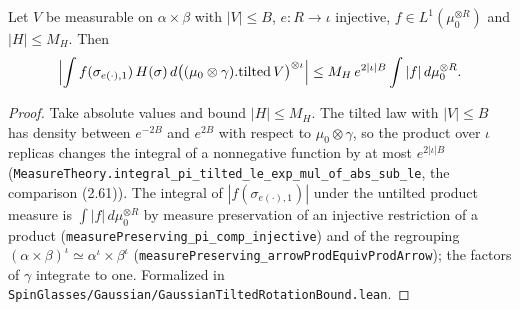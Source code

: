 \begin{lemma}\label{lem:sg-tal:perceptron-tilted-l1-bound}
  \leanok
Let $V$ be measurable on $\alpha\times\beta$ with $|V|\le B$, $e:R\to\iota$ injective, $f\in L^1(\mu_0^{\otimes R})$ and $|H|\le M_H$. Then
\[
 \Bigl|\int f(\sigma_{e(\cdot),1})\,H(\sigma)\,d\bigl((\mu_0\otimes\gamma).\mathrm{tilted}\,V\bigr)^{\otimes\iota}\Bigr|\le M_H\,e^{2|\iota|B}\int|f|\,d\mu_0^{\otimes R}.
\]
\end{lemma}
\begin{proof}
  \leanok
Take absolute values and bound $|H|\le M_H$. The tilted law with $|V|\le B$ has density between $e^{-2B}$ and $e^{2B}$ with respect to $\mu_0\otimes\gamma$, so the product over $\iota$ replicas changes the integral of a nonnegative function by at most $e^{2|\iota|B}$
(\texttt{MeasureTheory.integral\_pi\_tilted\_le\_exp\_mul\_of\_abs\_sub\_le}, the comparison (2.61)). The integral of $|f(\sigma_{e(\cdot),1})|$ under the untilted product measure is $\int|f|\,d\mu_0^{\otimes R}$ by measure preservation of an injective restriction of a product
(\texttt{measurePreserving\_pi\_comp\_injective}) and of the regrouping $(\alpha\times\beta)^\iota\simeq\alpha^\iota\times\beta^\iota$ (\texttt{measurePreserving\_arrowProdEquivProdArrow}); the factors of $\gamma$ integrate to one.
Formalized in \texttt{SpinGlasses/Gaussian/GaussianTiltedRotationBound.lean}.
\end{proof}

